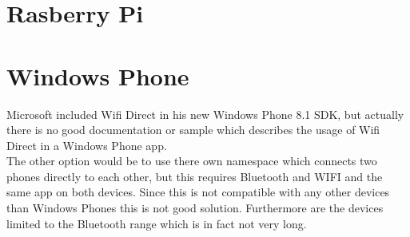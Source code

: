 \section{Rasberry Pi}
\label{sec:RasberryPi}

\section{Windows Phone}
\label{sec:WindowsPhone}
Microsoft included Wifi Direct in his new Windows Phone 8.1 SDK, but actually there is no good documentation or sample which describes the usage of Wifi Direct in a Windows Phone app.\\
The other option would be to use there own namespace which connects two phones directly to each other, but this requires Bluetooth and WIFI and the same app on both devices. Since this is not compatible with any other devices than Windows Phones this is not good solution. Furthermore are the devices limited to the Bluetooth range which is in fact not very long.